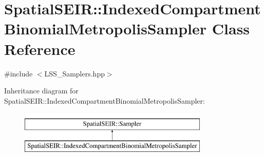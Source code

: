\hypertarget{classSpatialSEIR_1_1IndexedCompartmentBinomialMetropolisSampler}{\section{Spatial\-S\-E\-I\-R\-:\-:Indexed\-Compartment\-Binomial\-Metropolis\-Sampler Class Reference}
\label{classSpatialSEIR_1_1IndexedCompartmentBinomialMetropolisSampler}
}


{\ttfamily \#include $<$L\-S\-S\-\_\-\-Samplers.\-hpp$>$}

Inheritance diagram for Spatial\-S\-E\-I\-R\-:\-:Indexed\-Compartment\-Binomial\-Metropolis\-Sampler\-:\begin{figure}[H]
\begin{center}
\leavevmode
\includegraphics[height=2.000000cm]{classSpatialSEIR_1_1IndexedCompartmentBinomialMetropolisSampler}
\end{center}
\end{figure}
